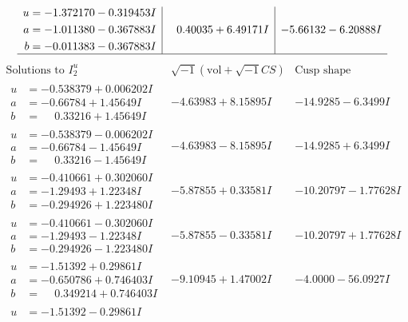 \documentclass[1p]{elsarticle_modified}
\theoremstyle{definition}
\newcommand{\I}{\sqrt{-1}}
\begin{document}
$$\begin{array}{c|c|c}
\begin{aligned}
u &= -1.372170 - 0.319453 I \\
a &= -1.011380 - 0.367883 I \\
b &= -0.011383 - 0.367883 I\end{aligned}
 & \phantom{-}0.40035 + 6.49171 I & -5.66132 - 6.20888 I\\
 \hline 
 \end{array}$$\newpage$$\begin{array}{c|c|c}  
\text{Solutions to }I^u_{2}& \I (\text{vol} + \sqrt{-1}CS) & \text{Cusp shape}\\
 \hline 
\begin{aligned}
u &= -0.538379 + 0.006202 I \\
a &= -0.66784 + 1.45649 I \\
b &= \phantom{-}0.33216 + 1.45649 I\end{aligned}
 & -4.63983 + 8.15895 I & -14.9285 - 6.3499 I \\ \hline\begin{aligned}
u &= -0.538379 - 0.006202 I \\
a &= -0.66784 - 1.45649 I \\
b &= \phantom{-}0.33216 - 1.45649 I\end{aligned}
 & -4.63983 - 8.15895 I & -14.9285 + 6.3499 I \\ \hline\begin{aligned}
u &= -0.410661 + 0.302060 I \\
a &= -1.29493 + 1.22348 I \\
b &= -0.294926 + 1.223480 I\end{aligned}
 & -5.87855 + 0.33581 I & -10.20797 - 1.77628 I \\ \hline\begin{aligned}
u &= -0.410661 - 0.302060 I \\
a &= -1.29493 - 1.22348 I \\
b &= -0.294926 - 1.223480 I\end{aligned}
 & -5.87855 - 0.33581 I & -10.20797 + 1.77628 I \\ \hline\begin{aligned}
u &= -1.51392 + 0.29861 I \\
a &= -0.650786 + 0.746403 I \\
b &= \phantom{-}0.349214 + 0.746403 I\end{aligned}
 & -9.10945 + 1.47002 I & -4.0000 - 56.0927 I \\ \hline\begin{aligned}
u &= -1.51392 - 0.29861 I \\

\end{aligned}
\end{array}$$
\end{document}
